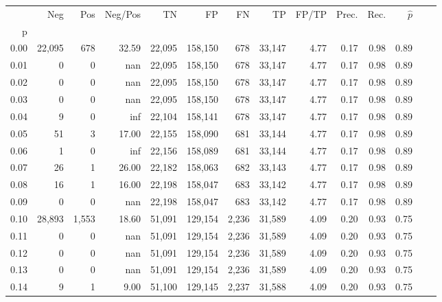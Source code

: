 \begin{tabular}{rrrrrrrrrrrrrr}
\toprule
{} &     Neg &    Pos & Neg/Pos &       TN &       FP &      FN &      TP & FP/TP & Prec. &  Rec. & $\hat{p}$ \\
p    &         &        &         &          &          &         &         &       &       &       &           \\
\midrule
0.00 &  22,095 &    678 &   32.59 &   22,095 &  158,150 &     678 &  33,147 &  4.77 &  0.17 &  0.98 &      0.89 \\
0.01 &       0 &      0 &     nan &   22,095 &  158,150 &     678 &  33,147 &  4.77 &  0.17 &  0.98 &      0.89 \\
0.02 &       0 &      0 &     nan &   22,095 &  158,150 &     678 &  33,147 &  4.77 &  0.17 &  0.98 &      0.89 \\
0.03 &       0 &      0 &     nan &   22,095 &  158,150 &     678 &  33,147 &  4.77 &  0.17 &  0.98 &      0.89 \\
0.04 &       9 &      0 &     inf &   22,104 &  158,141 &     678 &  33,147 &  4.77 &  0.17 &  0.98 &      0.89 \\
0.05 &      51 &      3 &   17.00 &   22,155 &  158,090 &     681 &  33,144 &  4.77 &  0.17 &  0.98 &      0.89 \\
0.06 &       1 &      0 &     inf &   22,156 &  158,089 &     681 &  33,144 &  4.77 &  0.17 &  0.98 &      0.89 \\
0.07 &      26 &      1 &   26.00 &   22,182 &  158,063 &     682 &  33,143 &  4.77 &  0.17 &  0.98 &      0.89 \\
0.08 &      16 &      1 &   16.00 &   22,198 &  158,047 &     683 &  33,142 &  4.77 &  0.17 &  0.98 &      0.89 \\
0.09 &       0 &      0 &     nan &   22,198 &  158,047 &     683 &  33,142 &  4.77 &  0.17 &  0.98 &      0.89 \\
0.10 &  28,893 &  1,553 &   18.60 &   51,091 &  129,154 &   2,236 &  31,589 &  4.09 &  0.20 &  0.93 &      0.75 \\
0.11 &       0 &      0 &     nan &   51,091 &  129,154 &   2,236 &  31,589 &  4.09 &  0.20 &  0.93 &      0.75 \\
0.12 &       0 &      0 &     nan &   51,091 &  129,154 &   2,236 &  31,589 &  4.09 &  0.20 &  0.93 &      0.75 \\
0.13 &       0 &      0 &     nan &   51,091 &  129,154 &   2,236 &  31,589 &  4.09 &  0.20 &  0.93 &      0.75 \\
0.14 &       9 &      1 &    9.00 &   51,100 &  129,145 &   2,237 &  31,588 &  4.09 &  0.20 &  0.93 &      0.75 \\

\end{tabular}
